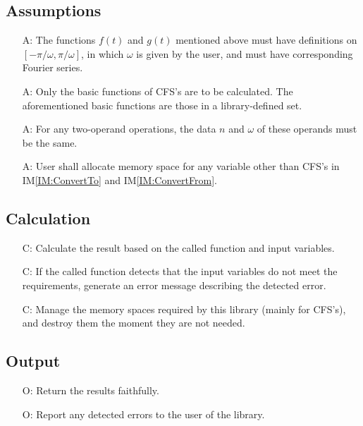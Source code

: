 \documentclass[12pt]{article}
\newcounter{assumpnum} %
\newcounter{calnum} %
\newcounter{outputnum} %
\newcommand{\iref}[1]{IM\ref{#1}}
\begin{document}
\subsection{Assumptions}

\begin{itemize}

\item[A\refstepcounter{assumpnum}\theassumpnum \label{Ass:FunctionProperty}:] 
The functions $f(t)$ and $g(t)$ mentioned above must have definitions on 
$[-\pi/\omega, \pi/\omega]$, in which $\omega$ is given by the user, 
and must have corresponding Fourier series.
\item[A\refstepcounter{assumpnum}\theassumpnum \label{Ass:BasicFunction}:] 
Only the basic functions of CFS's are to be calculated. The aforementioned 
basic functions are those in a library-defined set.
\item[A\refstepcounter{assumpnum}\theassumpnum \label{Ass:CFSPropertyMatch}:] 
For any two-operand operations, the data $n$ and $\omega$ of these operands 
must be the same. 
\item[A\refstepcounter{assumpnum}\theassumpnum \label{Ass:Memory}:] 
User shall allocate memory space for any variable other than 
CFS's in \iref{IM:ConvertTo} and \iref{IM:ConvertFrom}.
\end{itemize}

\subsection{Calculation} \label{sec_Calculation}
\begin{itemize}
\item[C\refstepcounter{calnum}\thecalnum \label{Cal:Normal}:] 
Calculate the result based on the called function and input variables.
\item[C\refstepcounter{calnum}\thecalnum \label{Cal:Error}:] 
If the called function detects that the input variables do not 
meet the requirements, generate an error message describing 
the detected error.
\item[C\refstepcounter{calnum}\thecalnum \label{Cal:Memory}:] 
Manage the memory spaces required by this library 
(mainly for CFS's), and destroy them the moment they are not needed.

\end{itemize}
\subsection{Output} \label{sec_Output}    
\begin{itemize}
\item[O\refstepcounter{outputnum}\theoutputnum \label{Output:Faithful}:] 
Return the results faithfully.
\item[O\refstepcounter{outputnum}\theoutputnum \label{Output:Error}:] 
Report any detected errors to the user of the library.
\end{itemize}
\end{document}
